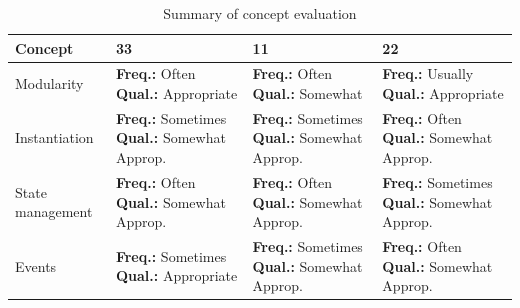 \renewcommand{\arraystretch}{1.1}

\begin{table}[h]
	\centering
	\footnotesize
	\begin{tabular}{
			>{\raggedright\arraybackslash}p{}
			>{\raggedright\arraybackslash}p{}
			>{\raggedright\arraybackslash}p{}
			>{\raggedright\arraybackslash}p{}
		}
		\hline
		\textbf{Concept} & \textbf{33}                                                         & \textbf{11} & \textbf{22} \\
		\hline

		Modularity
		                 & \textbf{Freq.:} Often \newline \textbf{Qual.:} Appropriate
		                 & \textbf{Freq.:} Often \newline \textbf{Qual.:} Somewhat
		                 & \textbf{Freq.:} Usually \newline \textbf{Qual.:} Appropriate                                    \\

		Instantiation
		                 & \textbf{Freq.:} Sometimes \newline \textbf{Qual.:} Somewhat Approp.
		                 & \textbf{Freq.:} Sometimes \newline \textbf{Qual.:} Somewhat Approp.
		                 & \textbf{Freq.:} Often \newline \textbf{Qual.:} Somewhat Approp.                                 \\

		State management
		                 & \textbf{Freq.:} Often \newline \textbf{Qual.:} Somewhat Approp.
		                 & \textbf{Freq.:} Often \newline \textbf{Qual.:} Somewhat Approp.
		                 & \textbf{Freq.:} Sometimes \newline \textbf{Qual.:} Somewhat Approp.                             \\

		Events
		                 & \textbf{Freq.:} Sometimes \newline \textbf{Qual.:} Appropriate
		                 & \textbf{Freq.:} Sometimes \newline \textbf{Qual.:} Somewhat Approp.
		                 & \textbf{Freq.:} Often \newline \textbf{Qual.:} Somewhat Approp.                                 \\

		\hline
	\end{tabular}
	\caption{Summary of concept evaluation}\label{tab:ArtifactSummarytable}
\end{table}